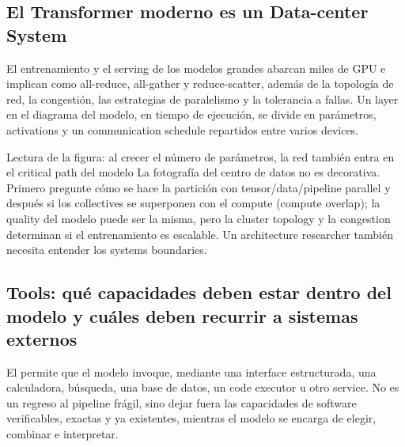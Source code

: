 \subsection{El Transformer moderno es un Data-center System}

El entrenamiento y el serving de los modelos grandes abarcan miles de GPU e implican  como all-reduce, all-gather y reduce-scatter, además de la topología de red, la congestión, las estrategias de paralelismo y la tolerancia a fallas. Un layer en el diagrama del modelo, en tiempo de ejecución, se divide en parámetros, activations y un communication schedule repartidos entre varios devices.


\begin{knowledgebox}{Lectura de la figura: al crecer el número de parámetros, la red también entra en el critical path del modelo}
La fotografía del centro de datos no es decorativa. Primero pregunte cómo se hace la partición con tensor/data/pipeline parallel y después si los collectives se superponen con el compute (compute overlap); la quality del modelo puede ser la misma, pero la cluster topology y la congestion determinan si el entrenamiento es escalable. Un architecture researcher también necesita entender los systems boundaries.
\end{knowledgebox}


\subsection{Tools: qué capacidades deben estar dentro del modelo y cuáles deben recurrir a sistemas externos}

El  permite que el modelo invoque, mediante una interface estructurada, una calculadora, búsqueda, una base de datos, un code executor u otro service. No es un regreso al pipeline frágil, sino dejar fuera las capacidades de software verificables, exactas y ya existentes, mientras el modelo se encarga de elegir, combinar e interpretar.

